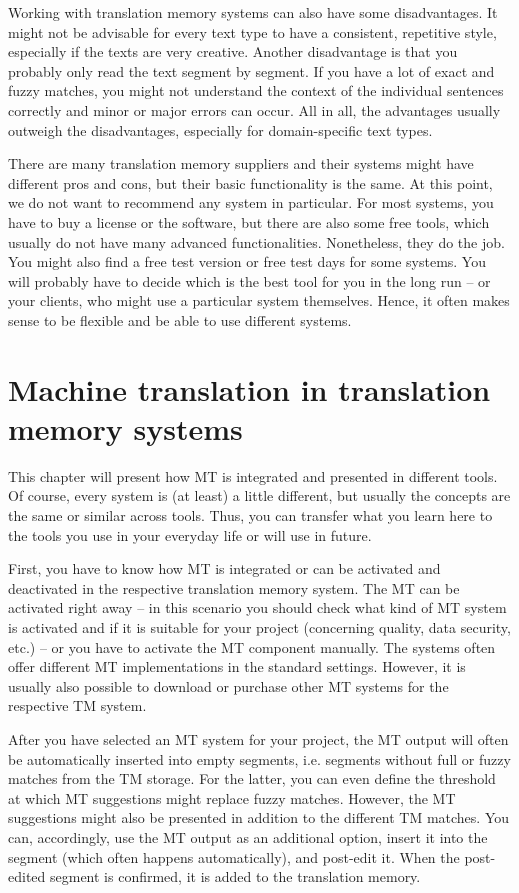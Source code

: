 Working with translation memory systems can also have some disadvantages. It might not be advisable for every text type to have a consistent, repetitive style, especially if the texts are very creative. Another disadvantage is that you probably only read the text segment by segment. If you have a lot of exact and fuzzy matches, you might not understand the context of the individual sentences correctly and minor or major errors can occur. All in all, the advantages usually outweigh the disadvantages, especially for domain-specific text types.

There are many translation memory suppliers and their systems might have different pros and cons, but their basic functionality is the same. At this point, we do not want to recommend any system in particular. For most systems, you have to buy a license or the software, but there are also some free tools, which usually do not have many advanced functionalities. Nonetheless, they do the job. You might also find a free test version or free test days for some systems. You will probably have to decide which is the best tool for you in the long run -- or your clients, who might use a particular system themselves. Hence, it often makes sense to be flexible and be able to use different systems.

\section{Machine translation in translation memory systems}\label{sec:6:2}

This chapter will present how MT is integrated and presented in different tools. Of course, every system is (at least) a little different, but usually the concepts are the same or similar across tools. Thus, you can transfer what you learn here to the tools you use in your everyday life or will use in future.

First, you have to know how MT is integrated or can be activated and deactivated in the respective translation memory system. The MT can be activated right away -- in this scenario you should check what kind of MT system is activated and if it is suitable for your project (concerning quality, data security, etc.) -- or you have to activate the MT component manually. The systems often offer different MT implementations in the standard settings. However, it is usually also possible to download or purchase other MT systems for the respective TM system. 

After you have selected an MT system for your project, the MT output will often be automatically inserted into empty segments, i.e. segments without full or fuzzy matches from the TM storage. For the latter, you can even define the threshold at which MT suggestions might replace fuzzy matches. However, the MT suggestions might also be presented in addition to the different TM matches. You can, accordingly, use the MT output as an additional option, insert it into the segment (which often happens automatically), and post-edit it. When the post-edited segment is confirmed, it is added to the translation memory.

